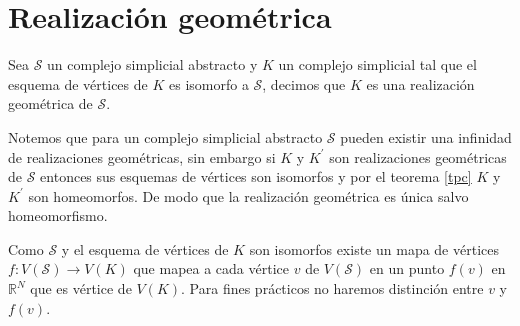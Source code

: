 \section{Realización geométrica}
\begin{Defi}
Sea $\mathcal{S}$ un complejo simplicial abstracto y $K$ un complejo simplicial tal que el esquema de vértices de $K$ es isomorfo a $\mathcal{S}$, decimos que $K$ es una realización geométrica de $\mathcal{S}$.
\end{Defi}
Notemos que para un complejo simplicial abstracto $\mathcal{S}$ pueden existir una infinidad de realizaciones geométricas, sin embargo si $K$ y $K^{'}$ son realizaciones geométricas de $\mathcal{S}$ entonces sus esquemas de vértices son isomorfos y por el teorema \ref{tpc} $K$ y $K^{'}$ son homeomorfos. De modo que la realización geométrica es única salvo homeomorfismo.

Como $\mathcal{S}$ y el esquema de vértices de $K$ son isomorfos existe un mapa de vértices $f\colon V(\mathcal{S})\rightarrow V(K)$ que mapea a cada vértice $v$ de $V(\mathcal{S})$ en un punto $f(v)$ en $\mathbb{R}^N$ que es vértice de $V(K)$. Para fines prácticos no haremos distinción entre $v$ y $f(v)$.


